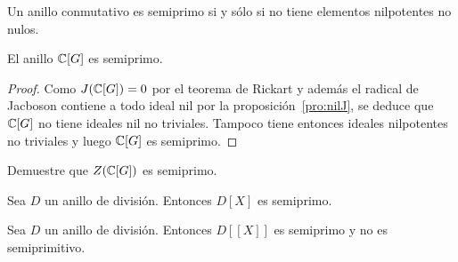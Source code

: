 \begin{example}
	Un anillo conmutativo es semiprimo si y sólo si no tiene elementos
	nilpotentes no nulos.
\end{example}


\begin{proposition}
	El anillo $\mathbb{C}[G]$ es semiprimo.
\end{proposition}

\begin{proof}
	Como $J(\mathbb{C}[G])=0$ por el teorema de Rickart y además el radical de Jacboson
	contiene a todo ideal nil por la proposición~\ref{pro:nilJ}, se deduce que
	$\mathbb{C}[G]$ no tiene ideales nil no triviales. Tampoco tiene entonces ideales
	nilpotentes no triviales y luego $\mathbb{C}[G]$ es semiprimo.
\end{proof}

\begin{exercise}
	Demuestre que $Z(\mathbb{C}[G])$ es semiprimo.
\end{exercise}


\begin{example}
	Sea $D$ un anillo de división. Entonces $D[X]$ es semiprimo.
\end{example}

\begin{example}
	Sea $D$ un anillo de división. Entonces $D[[X]]$ es semiprimo y no es
	semiprimitivo.
\end{example}




